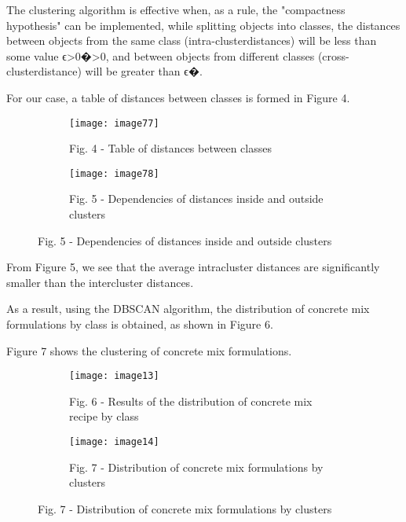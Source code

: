 The clustering algorithm is effective when, as a rule, the "compactness
hypothesis" can be implemented, while splitting objects into classes,
the distances between objects from the same class
(intra-clusterdistances) will be less than some value
ϵ\textgreater0�\textgreater0, and between objects from different classes
(cross-clusterdistance) will be greater than ϵ�.

For our case, a table of distances between classes is formed in Figure 4.

\begin{figure}[H]
\begin{subfigure}[b]{0.5\linewidth}
  \centering
  \texttt{[image: image77]}
  \caption*{Fig. 4 - Table of distances between classes}
\end{subfigure}
\begin{subfigure}[b]{0.5\linewidth}
  \centering
  \texttt{[image: image78]}
  \caption*{Fig. 5 - Dependencies of distances inside and outside clusters}
\end{subfigure}
\end{figure}

From Figure 5, we see that the average intracluster distances are
significantly smaller than the intercluster distances.


As a result, using the DBSCAN algorithm, the distribution of concrete
mix formulations by class is obtained, as shown in Figure 6.

Figure 7 shows the clustering of concrete mix formulations.

\begin{figure}[H]
\begin{subfigure}[b]{0.45\textwidth}
  \centering
  \texttt{[image: image13]}
  \caption*{Fig. 6 - Results of the distribution of concrete mix recipe by class}
\end{subfigure}
\hspace{0.05\textwidth}
\begin{subfigure}[b]{0.45\textwidth}
  \centering
  \texttt{[image: image14]}
  \caption*{Fig. 7 - Distribution of concrete mix formulations by clusters}
\end{subfigure}
\end{figure}

